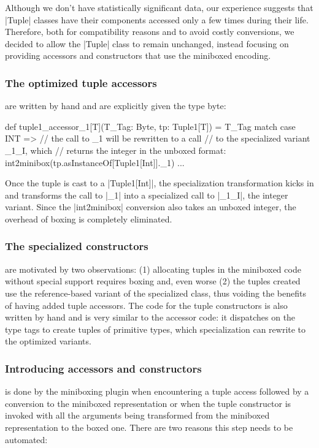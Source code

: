 Although we don't have statistically significant data, our experience suggests that |Tuple| classes have their components accessed only a few times during their life. Therefore, both for compatibility reasons and to avoid costly conversions, we decided to allow the |Tuple| class to remain unchanged, instead focusing on providing accessors and constructors that use the miniboxed encoding.

\subsubsection*{The optimized tuple accessors} are written by hand and are explicitly given the type byte:

\begin{lstlisting-nobreak}
 def tuple1_accessor_1[T](T_Tag: Byte, tp: Tuple1[T]) =
   T_Tag match {
     case INT =>
       // the call to _1 will be rewritten to a call
       // to the specialized variant _1_I, which
       // returns the integer in the unboxed format:
       int2minibox(tp.asInstanceOf[Tuple1[Int]]._1)
     ...
   }
\end{lstlisting-nobreak}

Once the tuple is cast to a |Tuple1[Int]|, the specialization transformation kicks in and transforms the call to |_1| into a specialized call to |_1_I|, the integer variant. Since the |int2minibox| conversion also takes an unboxed integer, the overhead of boxing is completely eliminated.


\subsubsection*{The specialized constructors} are motivated by two observations: (1) allocating tuples in the miniboxed code without special support requires boxing and, even worse (2) the tuples created use the reference-based variant of the specialized class, thus voiding the benefits of having added tuple accessors. The code for the tuple constructors is also written by hand and is very similar to the accessor code: it dispatches on the type tags to create tuples of primitive types, which specialization can rewrite to the optimized variants.


\subsubsection*{Introducing accessors and constructors} is done by the miniboxing plugin when encountering a tuple access followed by a conversion to the miniboxed representation or when the tuple constructor is invoked with all the arguments being transformed from the miniboxed representation to the boxed one. There are two reasons this step needs to be automated:

